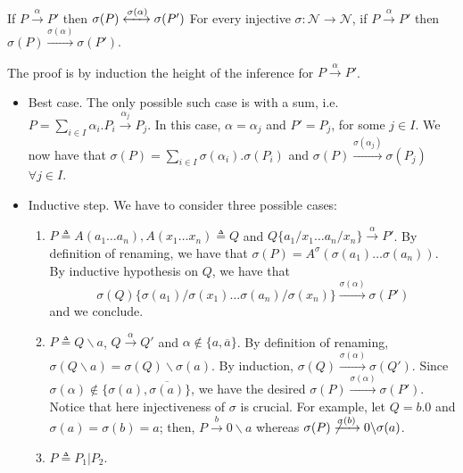 \begin{Thm}{If $P\xrightarrow{\alpha}P'$ then $\sigma(P)\xleftrightarrow{\sigma(\alpha)}\sigma(P')$}{}
For every injective $\sigma: \mathcal{N}\to\mathcal{N}$, if $P\xrightarrow{\alpha}P'$ then $\sigma(P)\xrightarrow{\sigma(\alpha)}\sigma(P')$.
\begin{demonstration}
    The proof is by induction the height of the inference for $P\xrightarrow{\alpha}P'$.
    \begin{itemize}
        \item Best case. The only possible such case is with a sum, i.e. $P=\sum_{i \in I}\alpha_i.P_i\xrightarrow{\alpha_j}P_j$.
        In this case, $\alpha =\alpha_j$ and $P'=P_j$, for some $j\in I$.
        We now have that $\sigma(P)=\sum_{i\in I}\sigma(\alpha_i).\sigma(P_i)$ and $\sigma(P)\xrightarrow{\sigma(\alpha_j)}\sigma(P_j)$ $\forall j\in I$.
        \item Inductive step. We have to consider three possible cases:
        \begin{enumerate}
            \item $P\triangleq A(a_1\ldots a_n),A(x_1\ldots x_n)\triangleq Q$ and $Q\{a_1/x_1\ldots a_n/x_n\}\xrightarrow{\alpha}P'$.
            By definition of renaming, we have that $\sigma(P)=A^\sigma(\sigma(a_1)\ldots \sigma(a_n))$.
            By inductive hypothesis on $Q$, we have that
            \begin{equation*}
                \sigma(Q)\{\sigma(a_1)/\sigma(x_1)\ldots \sigma(a_n)/\sigma(x_n)\}\xrightarrow{\sigma(\alpha)}\sigma(P')
            \end{equation*}
            and we conclude.
            \item $P\triangleq Q\backslash a$, $Q\xrightarrow{\alpha}Q'$ and $\alpha\notin\{a,\overline{a}\}$.
            By definition of renaming, $\sigma(Q\backslash a)=\sigma(Q)\backslash \sigma(a)$.
            By induction, $\sigma(Q)\xrightarrow{\sigma(\alpha)}\sigma(Q')$.
            Since $\sigma(\alpha)\notin\{\sigma(a),\overline{\sigma(a)}\}$, we have the desired $\sigma(P)\xrightarrow{\sigma(\alpha)}\sigma(P')$.
            Notice that here injectiveness of $\sigma$ is crucial.
            For example, let $Q=b.0$ and $\sigma(a)=\sigma(b)=a$; then, $P\xrightarrow{b}0\backslash a$ whereas $\sigma(P)\not\xrightarrow{\sigma(b)}0\backslash \sigma(a)$.
            \item $P\triangleq P_1|P_2$.
        \end{enumerate}
    
    \end{itemize}
\end{demonstration}
\end{Thm}

